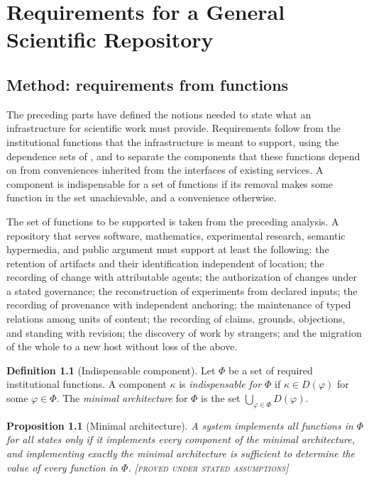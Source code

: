 \documentclass[11pt,twoside,openright]{book}
\theoremstyle{plain}
\newtheorem{proposition}[theorem]{Proposition}
\theoremstyle{definition}
\newtheorem{definition}[theorem]{Definition}
\theoremstyle{remark}
\newcommand{\Proved}{\textup{\textsc{[proved under stated assumptions]}}}
\begin{document}
\chapter{Requirements for a General Scientific Repository}\label{ch:requirements}

\section{Method: requirements from functions}

The preceding parts have defined the notions needed to state what an infrastructure for scientific work must provide. Requirements follow from the institutional functions that the infrastructure is meant to support, using the dependence sets of , and to separate the components that these functions depend on from conveniences inherited from the interfaces of existing services. A component is indispensable for a set of functions if its removal makes some function in the set unachievable, and a convenience otherwise.

The set of functions to be supported is taken from the preceding analysis. A repository that serves software, mathematics, experimental research, semantic hypermedia, and public argument must support at least the following: the retention of artifacts and their identification independent of location; the recording of change with attributable agents; the authorization of changes under a stated governance; the reconstruction of experiments from declared inputs; the recording of provenance with independent anchoring; the maintenance of typed relations among units of content; the recording of claims, grounds, objections, and standing with revision; the discovery of work by strangers; and the migration of the whole to a new host without loss of the above.

\begin{definition}[Indispensable component]\label{def:indispensable}
Let $\Phi$ be a set of required institutional functions. A component $\kappa$ is \emph{indispensable for $\Phi$} if $\kappa\in D(\varphi)$ for some $\varphi\in\Phi$. The \emph{minimal architecture} for $\Phi$ is the set $\bigcup_{\varphi\in\Phi}D(\varphi)$.
\end{definition}

\begin{proposition}[Minimal architecture]\label{prop:minarch}
A system implements all functions in $\Phi$ for all states only if it implements every component of the minimal architecture, and implementing exactly the minimal architecture is sufficient to determine the value of every function in $\Phi$.
\Proved{}
\end{proposition}
\end{document}
